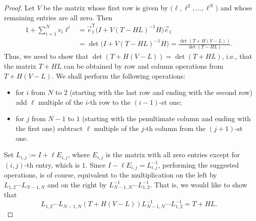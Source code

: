 \documentclass[10pt,a4paper]{amsart}
\begin{document}
\begin{proof}
Let \( V \) be the matrix whose first row is given by \( \big(\ell,\ell^2,\ldots,\ell^N\big) \) and whose remaining entries are all zero. Then
\begin{align*}
1 + \sum_{i=1}^N v_i\ell^i &= \vec e_1^\mathsf{T}\big(I + V (T-HL)^{-1} H\big)\vec e_1 \\
 &= \det\big(I + V (T-HL)^{-1} H\big) =\frac{\det(T+H(V-L))}{\det(T-HL)}.
\end{align*}
Thus, we need to show that \( \det(T+H(V-L))=\det(T+HL) \), i.e., that the matrix \( T+HL \) can be obtained by row and column operations from \( T+H(V-L) \). We shall perform the following operations:
\begin{itemize}
    \item for \( i \) from \( N \) to \( 2 \) (starting with the last row and ending with the second row) add \( \ell \) multiple of the \( i \)-th row to the \( (i-1)\)-st one;
    \item for \( j \) from \( N-1 \) to \( 1 \) (starting with the penultimate column and ending with the first one) subtract \( \ell \) multiple of the \( j \)-th column from the \( (j+1)\)-st one.
\end{itemize}
Set \( L_{i,j} := I + \ell E_{i,j} \), where \( E_{i,j} \) is the matrix with all zero entries except for \( (i,j) \)-th entry, which is \( 1 \). Since \(  I - \ell E_{i,j} = L_{i,j}^{-1} \), performing the suggested operations, is of course, equivalent to the multiplication on the left by \( L_{1,2} \cdots L_{N-1,N} \) and on the right by \( L_{N-1,N}^{-1} \cdots L_{1,2}^{-1} \). That is, we would like to show that
\[
L_{1,2} \cdots L_{N-1,N} (T+H(V-L)) L_{N-1,N}^{-1} \cdots L_{1,2}^{-1} = T+HL.
\]


\end{proof}
\end{document}
